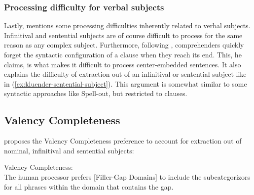 \subsubsection{Processing difficulty for verbal subjects}

Lastly, \citet{Kluender.2004} mentions some processing difficulties inherently related to verbal subjects. Infinitival and sentential subjects are of course difficult to process for the same reason as any complex subject. Furthermore, following \citet[106]{Kluender.2004}, comprehenders quickly forget the syntactic configuration of a clause when they reach its end. This, he claims, is what makes it difficult to process center-embedded sentences. It also explains the difficulty of extraction out of an infinitival or sentential subject like in (\ref{ex:kluender-sentential-subject}). This argument is somewhat similar to some syntactic approaches like Spell-out, but restricted to clauses.

\begin{exe}
\ex \citep[118]{Kluender.2004}
\label{ex:kluender-sentential-subject}
\begin{xlist}
\label{ex:kluender-sentential-subject-finite}
\label{ex:kluender-sentential-subject-infinite}
\label{ex:kluender-sentential-subject-gerund}
\end{xlist}
\end{exe}



\subsection{Valency Completeness}

\citeauthor{Hawkins.1999} proposes the Valency Completeness preference to account for extraction out of nominal, infinitival and sentential subjects:

\ea Valency Completeness:\\
The human processor prefers [Filler-Gap Domains] to include the subcategorizors for all phrases within the domain that contains the gap. \citep[278]{Hawkins.1999}
\z 

